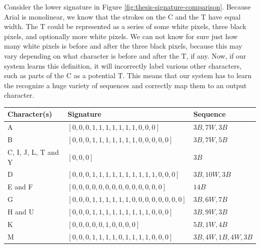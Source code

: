 Consider the lower signature in Figure \ref{fig:thesis-signature-comparison}. Because Arial is monolinear, we know that the strokes on the C and the T have equal width. The T could be represented as a series of some white pixels, three black pixels, and optionally more white pixels. We can not know for sure just how many white pixels is before and after the three black pixels, because this may vary depending on what character is before and after the T, if any. Now, if our system learns this definition, it will incorrectly label various other characters, such as parts of the C as a potential T. This means that our system has to learn the recognize a huge variety of sequences and correctly map them to an output character.

\begin{table}[H]
    \centering
    \begin{tabular}{|l|l|l|}
        \hline 
        \textbf{Character(s)} & \textbf{Signature}                                    & \textbf{Sequence}            \\ \hline
        A                     & \([0, 0, 0, 1, 1, 1, 1, 1, 1, 1, 0, 0, 0]\)             & \(3B, 7W, 3B\)                 \\ \hline
        B                     & \([0, 0, 0, 1, 1, 1, 1, 1, 1, 1, 0, 0, 0, 0, 0]\)       & \(3B, 7W, 5B\)                 \\ \hline
        C, I, J, L, T and Y   & \([0, 0, 0]\)                                           & \(3B\)                         \\ \hline
        D                     & \([0, 0, 0, 1, 1, 1, 1, 1, 1, 1, 1, 1, 1, 0, 0, 0]\)    & \(3B, 10W, 3B\)                \\ \hline
        E and F               & \([0, 0, 0, 0, 0, 0, 0, 0, 0, 0, 0, 0, 0, 0]\)          & \(14B\)                        \\ \hline
        G                     & \([0, 0, 0, 1, 1, 1, 1, 1, 1, 0, 0, 0, 0, 0, 0, 0, 0]\) & \(3B, 6W, 7B\)                 \\ \hline
        H and U               & \([0, 0, 0, 1, 1, 1, 1, 1, 1, 1, 1, 1, 0, 0, 0]\)       & \(3B, 9W, 3B\)                 \\ \hline
        K                     & \([0, 0, 0, 0, 0, 1, 0, 0, 0, 0]\)                      & \(5B, 1W, 4B\)                 \\ \hline
        M                     & \([0, 0, 0, 1, 1, 1, 1, 0, 1, 1, 1, 1, 0, 0, 0]\)       & \(3B, 4W, 1B, 4W, 3B\)         \\ \hline

\end{tabular}
\end{table}
